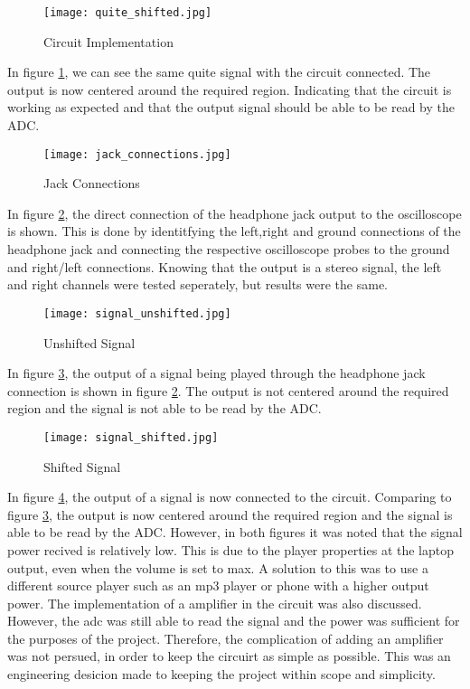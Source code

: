 \documentclass{article}
\begin{document}
\begin{figure}[htpb]
    \centering
    \texttt{[image: quite\_shifted.jpg]}
    \caption{Circuit Implementation}
    \label{fig4}
\end{figure}

In figure \ref{fig4}, we can see the same quite signal with the circuit connected. The output is now centered around the required region. Indicating that the circuit is working as expected and that the output signal should be able to be read by the ADC.


\begin{figure}[htpb]
    \centering
    \texttt{[image: jack\_connections.jpg]}
    \caption{Jack Connections}
    \label{fig5}
\end{figure}

In figure \ref{fig5}, the direct connection of the headphone jack output to the oscilloscope is shown. This is done by identitfying the left,right and ground connections of the headphone jack and connecting the respective oscilloscope probes to the ground and right/left connections. Knowing that the output is a stereo signal, the left and right channels were tested seperately, but results were the same.

\begin{figure}[htpb]
    \centering
    \texttt{[image: signal\_unshifted.jpg]}
    \caption{Unshifted Signal}
    \label{fig6}
\end{figure}

In figure \ref{fig6}, the output of a signal being played through the headphone jack connection is shown in figure \ref{fig5}. The output is not centered around the required region and the signal is not able to be read by the ADC. 

\begin{figure}[htpb]
    \centering
    \texttt{[image: signal\_shifted.jpg]}
    \caption{Shifted Signal}
    \label{fig7}
\end{figure}

In figure \ref{fig7}, the output of a signal is now connected to the circuit. Comparing to figure \ref{fig6}, the output is now centered around the required region and the signal is able to be read by the ADC. However, in both figures it was noted that the signal power recived is relatively low. This is due to the player properties at the laptop output, even when the volume is set to max. A solution to this was to use a different source player such as an mp3 player or phone with a higher output power. The implementation of a amplifier in the circuit was also discussed. However, the adc was still able to read the signal and the power was sufficient for the purposes of the project. Therefore, the complication of adding an amplifier was not persued, in order to keep the circuirt as simple as possible. This was an engineering desicion made to keeping the project within scope and simplicity.
\end{document}
